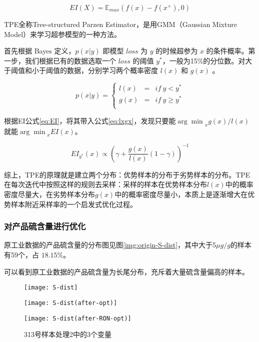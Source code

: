 \documentclass[bwprint]{gmcmthesis}
\begin{document}
\begin{equation}\label{eq:EI}
	EI(X)=\mathbb{E}_{max}(f(x)-f(x^+), 0)
\end{equation}

TPE全称Tree-structured Parzen Estimator，是用GMM（Gaussian Mixture Model）来学习超参模型的一种方法。

首先根据 Bayes 定义，$p(x|y)$ 即模型 $loss$ 为 $y$ 的时候超参为 $x$ 的条件概率。第一步，我们根据已有的数据选取一个 $loss$ 的阈值 $y^*$，一般为15\%的分位数。对大于阈值和小于阈值的数据，分别学习两个概率密度 $l(x)$ 和 $g(x)$ 。

\begin{equation}\label{eq:lxgx}
	p(x|y)=\left\{
	\begin{aligned}
		l(x) & = & if \ y<y^* \\
		g(x) & = & if \ y\ge y^* \\
	\end{aligned}
	\right.
\end{equation}

根据EI公式\eqref{eq:EI}，将其带入公式\eqref{eq:lxgx}，发现只要能${\arg\min}_x{g(x)/l(x)}$就能${\arg\min}_x{EI(x)}$。

\begin{equation}\label{EIlxgx}
	EI_{y^*}(x) \propto (\gamma+\frac{g(x)}{l(x)}(1 - \gamma))^{-1}
\end{equation}

综上，TPE的原理就是建立两个分布：优势样本的分布于劣势样本的分布。TPE在每次迭代中按照这样的规则去采样：采样的样本在优势样本分布$l(x)$中的概率密度尽量大，在劣势样本分布$g(x)$中的概率密度尽量小，本质上是逐渐增大在优势样本附近采样率的一个启发式优化过程。




\FloatBarrier
\subsubsection{对产品硫含量进行优化}


原工业数据的产品硫含量的分布图见图\ref{img:origin-S-dist}，其中大于5$\mu g/g$的样本有59个，占 $18.15\%$。

可以看到原工业数据的产品硫含量为长尾分布，充斥着大量硫含量偏高的样本。


\begin{figure}[htb]
	\centering
	\begin{minipage}[c]{0.4\textwidth}
		\centering
		\texttt{[image: S-dist]}
		\label{img:origin-S-dist}
	\end{minipage}
	\begin{minipage}[c]{0.4\textwidth}
		\centering
		\texttt{[image: S-dist(after-opt)]}
		\label{img:single-S-dist}
	\end{minipage}
	\begin{minipage}[c]{0.4\textwidth}
		\centering
		\texttt{[image: S-dist(after-RON-opt)]}
		\label{img:joint-S-dist}
	\end{minipage}
	\caption{313号样本处理2中的3个变量}
\end{figure}
\end{document}
